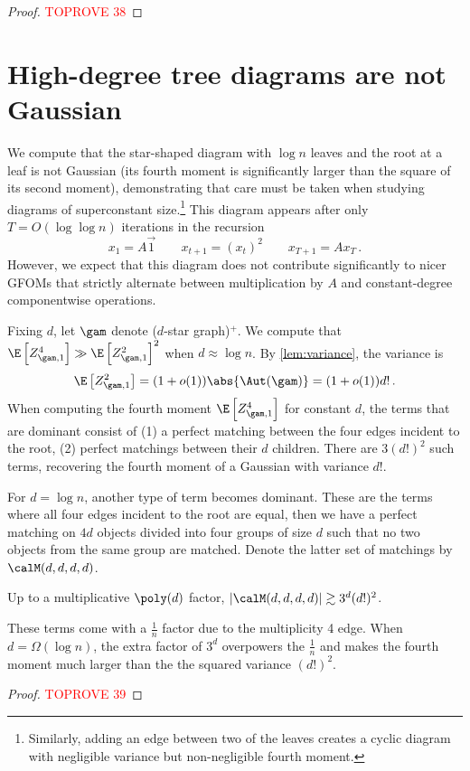 \documentclass[12pt]{article}
\begin{document}
\empiricalExpectation*

\begin{proof}\textcolor{red}{TOPROVE 38}\end{proof}
 
\section{High-degree tree diagrams are not Gaussian}
\label{sec:star}


We compute that the star-shaped diagram with $\log n$
leaves and the root at a leaf is not Gaussian
(its fourth moment is significantly larger than the square of its second moment), demonstrating that care must be taken when studying diagrams of superconstant size.\footnote{Similarly, adding an edge between two of the leaves creates a cyclic diagram with negligible variance but non-negligible fourth moment.}
This diagram appears after only $T = O(\log \log n)$ iterations in 
the recursion
\[x_1 = A \vec{1} \qquad x_{t+1} = (x_t)^2 \qquad x_{T+1} = A x_T\,.\]
However, we expect that this diagram does not contribute significantly to nicer GFOMs that strictly alternate between multiplication by $A$ and constant-degree componentwise operations.


Fixing $d$, let $\gam$ denote ($d$-star graph)$^+$.
We compute that $\E\left[Z_{\gam,1}^4\right] \gg \E\left[Z_{\gam,1}^2\right]^2$ when $d \approx \log n$.
By \cref{lem:variance}, the variance is
\[\E\left[Z_{\gam, 1}^2\right] = (1+o(1))\abs{\Aut(\gam)} = (1+o(1))d!\,.\]
When computing the fourth moment $\E\left[Z_{\gam, 1}^4\right]$ for constant $d$, the terms that are dominant
consist of (1) a perfect matching between the four edges incident to the root, (2) perfect matchings between their $d$ children.
There are $3(d!)^2$ such terms, recovering the fourth moment of a Gaussian with variance $d!$.

For $d = \log n$, another type of term becomes dominant.
These are the terms where all four edges incident to the root are equal,
then we have a perfect matching on $4d$ objects divided into four groups
of size $d$ such that no two objects from the same group are matched.
Denote the latter set of matchings by $\calM(d,d,d,d)$.
\begin{lemma}\label{lem:four-matchings}
    Up to a multiplicative $\poly(d)$ factor, $|\calM(d,d,d,d)| \gtrsim 3^d (d!)^2$.
\end{lemma}
These terms come with a $\frac 1 n$ factor due to the multiplicity 4 edge.
When $d = \Omega(\log n)$, the extra factor of $3^d$ overpowers the $\frac 1 n$ and makes the fourth moment much larger than the
the squared variance $(d!)^2$.


\begin{proof}\textcolor{red}{TOPROVE 39}\end{proof}
 
\end{document}
